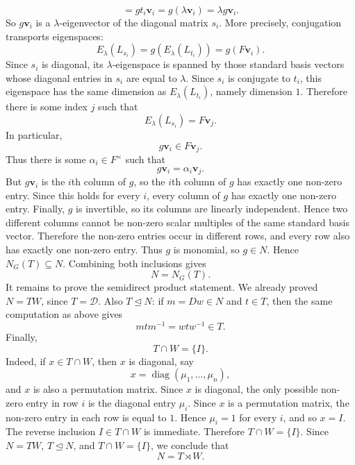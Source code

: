 \documentclass[../Odyssey_Project.tex]{subfiles}
\begin{document}
\begin{solution}
\[    =
    gt_i\mathbf v_i
    =
    g(\lambda\mathbf v_i)
    =
    \lambda g\mathbf v_i.
\]
So $g\mathbf v_i$ is a $\lambda$-eigenvector of the diagonal matrix $s_i$. More precisely, conjugation transports eigenspaces:
\[
    E_\lambda(L_{s_i})=g(E_\lambda(L_{t_i}))=g(F\mathbf v_i).
\]
Since $s_i$ is diagonal, its $\lambda$-eigenspace is spanned by those standard basis vectors whose diagonal entries in $s_i$ are equal to $\lambda$. Since $s_i$ is conjugate to $t_i$, this eigenspace has the same dimension as $E_\lambda(L_{t_i})$, namely dimension $1$. Therefore there is some index $j$ such that
\[
    E_\lambda(L_{s_i})=F\mathbf v_j.
\]
In particular,
\[
    g\mathbf v_i\in F\mathbf v_j.
\]
Thus there is some $\alpha_i\in F^\times$ such that
\[
    g\mathbf v_i=\alpha_i\mathbf v_j.
\]
But $g\mathbf v_i$ is the $i$th column of $g$, so the $i$th column of $g$ has exactly one non-zero entry. Since this holds for every $i$, every column of $g$ has exactly one non-zero entry. Finally, $g$ is invertible, so its columns are linearly independent. Hence two different columns cannot be non-zero scalar multiples of the same standard basis vector. Therefore the non-zero entries occur in different rows, and every row also has exactly one non-zero entry. Thus $g$ is monomial, so $g\in N$. Hence $N_G(T)\subseteq N$. Combining both inclusions gives
\[
    N=N_G(T).
\]
It remains to prove the semidirect product statement. We already proved $N=TW$, since $T=\mathcal D$. Also $T\trianglelefteq N$: if $m=Dw\in N$ and $t\in T$, then the same computation as above gives
\[
    mtm^{-1}=w t w^{-1}\in T.
\]
Finally,
\[
    T\cap W=\{I\}.
\]
Indeed, if $x\in T\cap W$, then $x$ is diagonal, say
\[
    x=\operatorname{diag}(\mu_1,\ldots,\mu_n),
\]
and $x$ is also a permutation matrix. Since $x$ is diagonal, the only possible non-zero entry in row $i$ is the diagonal entry $\mu_i$. Since $x$ is a permutation matrix, the non-zero entry in each row is equal to $1$. Hence $\mu_i=1$ for every $i$, and so $x=I$. The reverse inclusion $I\in T\cap W$ is immediate. Therefore $T\cap W=\{I\}$. Since $N=TW$, $T\trianglelefteq N$, and $T\cap W=\{I\}$, we conclude that
\[
    N=T\rtimes W.
\]
\end{solution}
\end{document}
